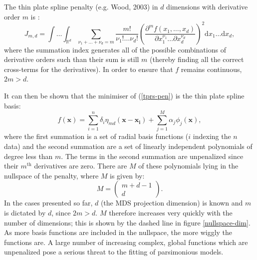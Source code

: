 \documentclass[useAMS,referee]{biom}
\begin{document}
The thin plate spline penalty (e.g. Wood, 2003) in $d$ dimensions with derivative order $m$ is :
\begin{equation}
J_{m,d} = \int \ldots \int_{\mathbb{R}^d} \sum_{\nu_1 + \dots + \nu_d=m} \frac{m!}{\nu_1! \dots \nu_d!} \left( \frac{\partial^m f \left (x_1,\dots,x_d \right )}{\partial x_1^{\nu_1} \ldots  \partial x_d^{\nu_d}} \right)^2 \text{d} x_1 \ldots  \text{d} x_d,
\label{tprs-pen}
\end{equation}
where the summation index generates all of the possible combinations of derivative orders such than their sum is still $m$ (thereby finding all the correct cross-terms for the derivatives). In order to ensure that $f$ remains continuous, $2m>d$.

It can then be shown that the minimiser of (\ref{tprs-pen}) is the thin plate spline basis:
\begin{equation}
f(\mathbf{x}) = \sum_{i=1}^n \delta_i \eta_{md}(\mathbf{x}-\mathbf{x_i}) + \sum_{j=1}^M \alpha_j \phi_j(\mathbf{x}),
\label{tprs-basis}
\end{equation}
where the first summation is a set of radial basis functions ($i$ indexing the $n$ data) and the second summation are a set of linearly independent polynomials of degree less than $m$. The terms in the second summation are unpenalized since their $m^\text{th}$ derivatives are zero. There are $M$ of these polynomials lying in the nullspace of the penalty, where $M$ is given by:
\begin{equation}
M=\begin{pmatrix} m+d-1 \\ d  \end{pmatrix}.
\label{gds-bigm}
\end{equation}
In the cases presented so far, $d$ (the MDS projection dimension) is known and $m$ is dictated by $d$, since $2m>d$. $M$ therefore increases very quickly with the number of dimensions; this is shown by the dashed line in figure \ref{nullspace-dim}. As more basis functions are included in the nullspace, the more wiggly the functions are. A large number of increasing complex, global functions which are unpenalized pose a serious threat to the fitting of parsimonious models.
\end{document}

